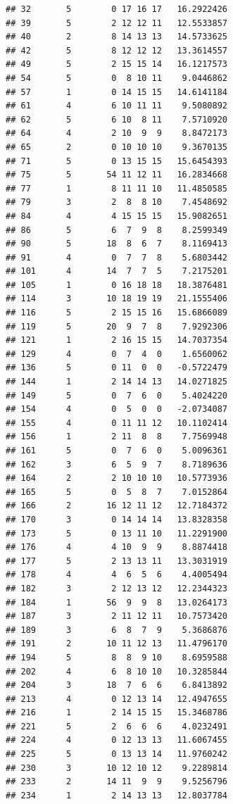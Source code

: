 \documentclass[
]{article}
\begin{document}
\begin{verbatim}
## 32       5        0 17 16 17   16.2922426
## 39       5        2 12 12 11   12.5533857
## 40       2        8 14 13 13   14.5733625
## 42       5        8 12 12 12   13.3614557
## 49       5        2 15 15 14   16.1217573
## 54       5        0  8 10 11    9.0446862
## 57       1        0 14 15 15   14.6141184
## 61       4        6 10 11 11    9.5080892
## 62       5        6 10  8 11    7.5710920
## 64       4        2 10  9  9    8.8472173
## 65       2        0 10 10 10    9.3670135
## 71       5        0 13 15 15   15.6454393
## 75       5       54 11 12 11   16.2834668
## 77       1        8 11 11 10   11.4850585
## 79       3        2  8  8 10    7.4548692
## 84       4        4 15 15 15   15.9082651
## 86       5        6  7  9  8    8.2599349
## 90       5       18  8  6  7    8.1169413
## 91       4        0  7  7  8    5.6803442
## 101      4       14  7  7  5    7.2175201
## 105      1        0 16 18 18   18.3876481
## 114      3       10 18 19 19   21.1555406
## 116      5        2 15 15 16   15.6866089
## 119      5       20  9  7  8    7.9292306
## 121      1        2 16 15 15   14.7037354
## 129      4        0  7  4  0    1.6560062
## 136      5        0 11  0  0   -0.5722479
## 144      1        2 14 14 13   14.0271825
## 149      5        0  7  6  0    5.4024220
## 154      4        0  5  0  0   -2.0734087
## 155      4        0 11 11 12   10.1102414
## 156      1        2 11  8  8    7.7569948
## 161      5        0  7  6  0    5.0096361
## 162      3        6  5  9  7    8.7189636
## 164      2        2 10 10 10   10.5773936
## 165      5        0  5  8  7    7.0152864
## 166      2       16 12 11 12   12.7184372
## 170      3        0 14 14 14   13.8328358
## 173      5        0 13 11 10   11.2291900
## 176      4        4 10  9  9    8.8874418
## 177      5        2 13 13 11   13.3031919
## 178      4        4  6  5  6    4.4005494
## 182      3        2 12 13 12   12.2344323
## 184      1       56  9  9  8   13.0264173
## 187      3        2 11 12 11   10.7573420
## 189      3        6  8  7  9    5.3686876
## 191      2       10 11 12 13   11.4796170
## 194      5        8  8  9 10    8.6959588
## 202      4        6  8 10 10   10.3285844
## 204      3       18  7  6  6    6.8413892
## 213      4        0 12 13 14   12.4947655
## 216      1        2 14 15 15   15.3468786
## 221      5        2  6  6  6    4.0232491
## 224      4        0 12 13 13   11.6067455
## 225      5        0 13 13 14   11.9760242
## 230      3       10 12 10 12    9.2289814
## 233      2       14 11  9  9    9.5256796
## 234      1        2 14 13 13   12.8037784

\end{verbatim}
\end{document}
